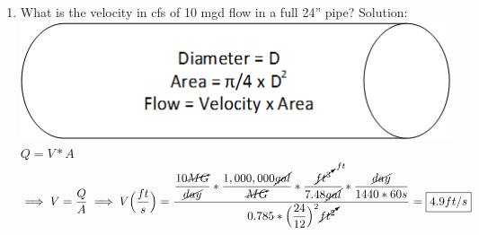 \documentclass{article}
\begin{document}
\begin{enumerate}
\item What is the velocity in cfs of 10 mgd flow in a full 24” pipe?
Solution:\\
\vspace{0.5cm}
\includegraphics[scale=0.5]{PipeFlow}\\
$Q=V*A$\\
$\implies V=\dfrac{Q}{A} \implies V \Big(\dfrac{ft}{s}\Big)= \dfrac{\dfrac{10\cancel{MG}}{\cancel{day}}*\dfrac{1,000,000\cancel{gal}}{\cancel{MG}}*\dfrac{\cancelto{ft}{ft^3}}{7.48\cancel{gal}}*\dfrac{\cancel{day}}{1440*60s}}{0.785*\Big(\dfrac{24}{12}\Big)^2\cancelto{}{ft^2}}=\boxed{4.9ft/s}$


\end{enumerate}
\end{document}

